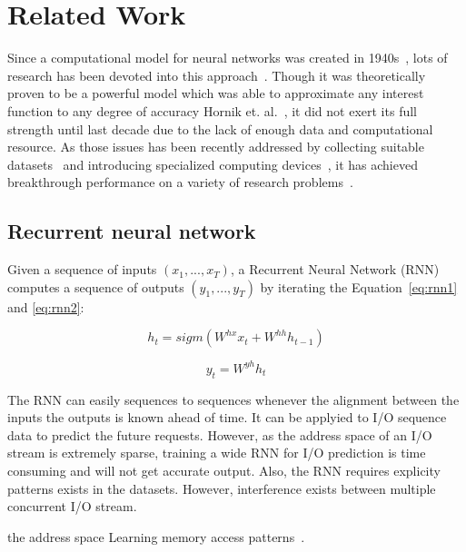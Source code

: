 \section{Related Work}

Since a computational model for neural networks was created in 1940s~\cite{McCulloch1943},
lots of research has been devoted into this approach~\cite{pouyanfar2018survey}.
Though it was theoretically proven to be a powerful model which was able to approximate any interest function to any degree of accuracy
Hornik et. al.~\cite{Hornik1989}, it did not exert its full strength until last decade due to the lack of enough data and computational resource.
As those issues has been recently addressed by collecting suitable datasets~\cite{JiaDeng2009}
and introducing specialized computing devices~\cite{Krizhevsky2012, Jouppi2017},
it has achieved breakthrough performance on a variety of research problems~\cite{Krizhevsky2012, Mnih2015, Silver2016, Bahdanau2014}.

\subsection{Recurrent neural network}

Given a sequence of inputs $(x_1, ..., x_T)$, a Recurrent Neural Network (RNN)~\cite{rumelhart1986learning, werbos1990backpropagation} computes a sequence of outputs $(y_1, ..., y_T)$ by iterating the Equation~\ref{eq:rnn1} and \ref{eq:rnn2}:

\begin{equation}
\label{eq:rnn1}
h_t = sigm(W^{hx}x_t + W^{hh}h_{t-1})
\end{equation}

\begin{equation}
\label{eq:rnn2}
y_t = W^{yh}h_t
\end{equation}

The RNN can easily sequences to sequences whenever the alignment between the inputs the outputs is known ahead of time.
It can be applyied to I/O sequence data to predict the future requests.
However, as the address space of an I/O stream is extremely sparse,
training a wide RNN for I/O prediction is time consuming and will not get accurate output.
Also, the RNN requires explicity patterns exists in the datasets.
However, interference exists between multiple concurrent I/O stream.

the address space Learning memory access patterns~\cite{hashemi2018learning, peled2018towards}.

